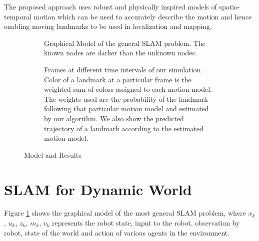 \documentclass[10pt,twocolumn,letterpaper]{article}
\begin{document}
The proposed approach uses robust and physically inspired models of spatio-temporal motion which can be used to accurately describe the motion and hence enabling moving landmarks to be used in localization and mapping.


\begin{figure*}[t]
  \begin{subfigure}[t]{0.33\textwidth}
    \scalebox{0.65}{  }
    \caption{Graphical Model of the general SLAM problem. The known nodes are darker than the unknown nodes.}
    \label{fig:graphical_model}
  \end{subfigure}
  \hskip1pt
  \vrule
  \hskip1pt
  \begin{subfigure}[t]{0.67\textwidth}
    \newlength{\imgwidth}
    \setlength{\imgwidth}{0.9\textwidth}
    \centering
    
    \caption{Frames at different time intervals of our simulation.
      Color of a landmark at a particular frame is the weighted sum of colors
      assigned to each motion model. The weights used are the probability of the
    landmark following that particular motion model and estimated by our algorithm. We also show the predicted trajectory of a landmark according to the estimated motion model.}
    \label{fig:results}
  \end{subfigure}
  \caption{Model and Results}
\end{figure*}

\section{SLAM for Dynamic World}
Figure \ref{fig:graphical_model} shows the graphical model of the most general SLAM problem, where $x_k$, $u_k$, $z_k$, $m_k$, $v_k$ represents the robot state, input to the robot, observation by robot, state of the world and action of various agents in the environment.

\end{document}
